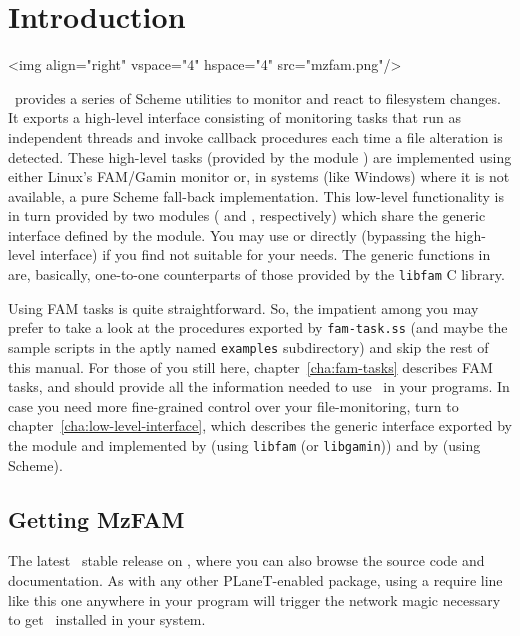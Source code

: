 
\chapter{Introduction}
\label{cha:introduction}

\htmlonly
\rawhtml<img align="right" vspace="4" hspace="4" src="mzfam.png"/>\endrawhtml
\endhtmlonly

\MzFam\ provides a series of Scheme utilities to monitor and react to
filesystem changes. It exports a high-level interface consisting of
monitoring tasks that run as independent threads and invoke callback
procedures each time a file alteration is detected. These high-level
tasks (provided by the module ) are implemented using
either Linux's FAM/Gamin monitor or, in systems (like Windows) where
it is not available, a pure Scheme fall-back implementation. This
low-level functionality is in turn provided by two modules (
and , respectively) which share the generic interface
defined by the  module. You may use  or
 directly (bypassing the high-level interface) if you find
 not suitable for your needs. The generic functions in
 are, basically, one-to-one counterparts of those
provided by the \texttt{libfam} C library.


Using FAM tasks is quite straightforward. So, the impatient among you
may prefer to take a look at the procedures exported by
\texttt{fam-task.ss} (and maybe the sample scripts in the aptly named
\texttt{examples} subdirectory) and skip the rest of this manual.
For those of you still here, chapter~\ref{cha:fam-tasks} describes FAM
tasks, and should provide all the information needed to use \MzFam\ in
your programs. In case you need more fine-grained control over your
file-monitoring, turn to chapter~\ref{cha:low-level-interface}, which
describes the generic interface exported by the  module
and implemented by  (using \texttt{libfam} (or
\texttt{libgamin})) and by  (using Scheme).


\section{Getting MzFAM}
\label{sec:getting-mzfam}

The latest \MzFam\ stable release
 on ,
where you can also browse the source code and documentation. As with
any other PLaneT-enabled package, using a require line like this one
anywhere in your program will trigger the network magic necessary
to get \MzFam\ installed in your system.

